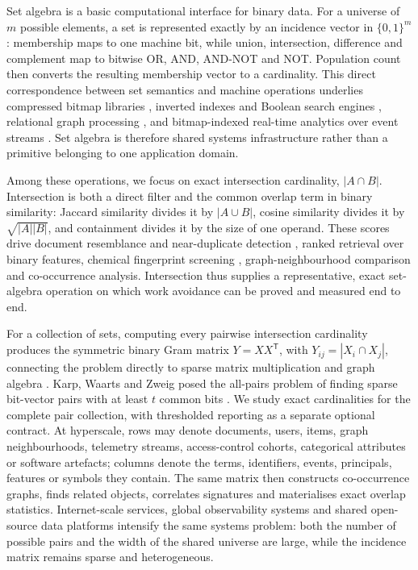 Set algebra is a basic computational interface for binary data. For a universe of $m$ possible
elements, a set is represented exactly by an incidence vector in $\{0,1\}^{m}$: membership maps to
one machine bit, while union, intersection, difference and complement map to bitwise OR, AND,
AND-NOT and NOT. Population count then converts the resulting membership vector to a cardinality.
This direct correspondence between set semantics and machine operations underlies compressed bitmap
libraries \cite{wu2006wah,chambi2016roaring,lemire2018roaring}, inverted indexes and Boolean search
engines \cite{zobel2006inverted,goodwin2017bitfunnel,lucene-sparsefixedbitset}, relational graph
processing \cite{aberger2016emptyheaded}, and bitmap-indexed real-time analytics over event streams
\cite{yang2014druid}. Set algebra is therefore shared systems infrastructure rather than a primitive
belonging to one application domain.

Among these operations, we focus on exact intersection cardinality, $|A\cap B|$. Intersection is both
a direct filter and the common overlap term in binary similarity: Jaccard similarity divides it by
$|A\cup B|$, cosine similarity divides it by $\sqrt{|A||B|}$, and containment divides it by the size
of one operand. These scores drive document resemblance and near-duplicate detection
\cite{broder1997resemblance,bayardo2007allpairs,xiao2008ppjoin}, ranked retrieval over binary
features, chemical fingerprint screening
\cite{swamidass2007bounds,haque2011tanimoto,dalke2019chemfp}, graph-neighbourhood comparison and
co-occurrence analysis. Intersection thus supplies a representative, exact set-algebra operation on
which work avoidance can be proved and measured end to end.

For a collection of sets, computing every pairwise intersection cardinality produces the symmetric
binary Gram matrix $Y=XX^{\mathsf T}$, with $Y_{ij}=|X_i\cap X_j|$, connecting the problem directly
to sparse matrix multiplication and graph algebra \cite{gustavson1978spgemm,buluc2011combinatorialblas}.
Karp, Waarts and Zweig posed the all-pairs problem of finding sparse bit-vector pairs with at least
$t$ common bits \cite{karp1995bitvector}. We study exact cardinalities for the complete pair
collection, with thresholded reporting as a separate optional contract. At hyperscale, rows may denote
documents, users, items, graph neighbourhoods, telemetry streams, access-control cohorts,
categorical attributes or software artefacts; columns denote the terms, identifiers, events,
principals, features or symbols they contain. The same matrix then constructs co-occurrence graphs,
finds related objects, correlates signatures and materialises exact overlap statistics. Internet-scale
services, global observability systems and shared open-source data platforms intensify the same
systems problem: both the number of possible pairs and the width of the shared universe are large,
while the incidence matrix remains sparse and heterogeneous.

